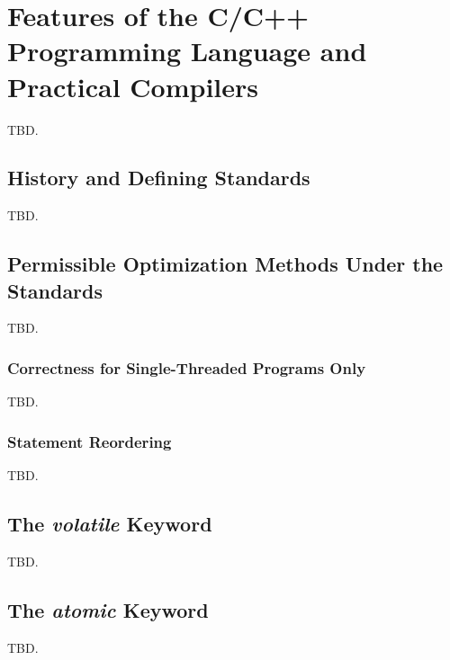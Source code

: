 \section{Features of the C/C++ Programming Language and Practical Compilers}
\label{scco0}

TBD.


\subsection{History and Defining Standards}
\label{scco0:shds0}

TBD.


\subsection{Permissible Optimization Methods Under the Standards}
\label{scco0:spom0}

TBD.


\subsubsection{Correctness for Single-Threaded Programs Only}
\label{scco0:spom0:scst0}

TBD.


\subsubsection{Statement Reordering}
\label{scco0:spom0:ssro0}

TBD.


\subsection{The \emph{volatile} Keyword}
\label{scco0:skwv0}

TBD.

\subsection{The \emph{atomic} Keyword}
\label{scco0:skwa0}

TBD.
